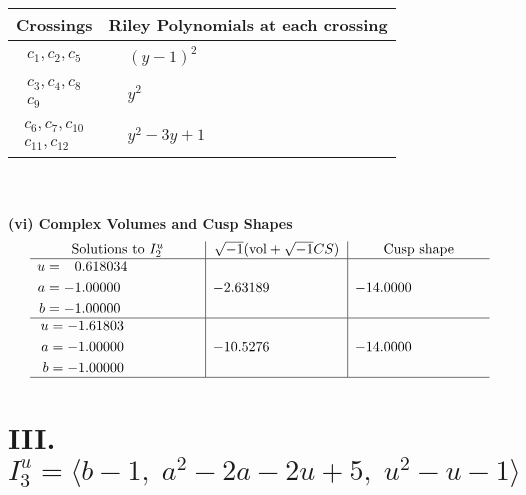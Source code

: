 \documentclass[1p]{elsarticle_modified}
\theoremstyle{definition}
\newcommand{\I}{\sqrt{-1}}
\begin{document}
\begin{tabular}{m{50pt}|m{274pt}}
Crossings & \hspace{64pt}Riley Polynomials at each crossing \\
\hline $$\begin{aligned}c_{1},c_{2},c_{5}\end{aligned}$$&$\begin{aligned}
&(y-1)^2
\end{aligned}$\\
\hline $$\begin{aligned}c_{3},c_{4},c_{8}\\c_{9}\end{aligned}$$&$\begin{aligned}
&y^2
\end{aligned}$\\
\hline $$\begin{aligned}c_{6},c_{7},c_{10}\\c_{11},c_{12}\end{aligned}$$&$\begin{aligned}
&y^2-3 y+1
\end{aligned}$\\
\hline
\end{tabular}\\~\\
\newpage\flushleft \textbf{(vi) Complex Volumes and Cusp Shapes}
$$\begin{array}{c|c|c}  
\text{Solutions to }I^u_{2}& \I (\text{vol} + \sqrt{-1}CS) & \text{Cusp shape}\\
 \hline 
\begin{aligned}
u &= \phantom{-}0.618034\phantom{ +0.000000I} \\
a &= -1.00000\phantom{ +0.000000I} \\
b &= -1.00000\phantom{ +0.000000I}\end{aligned}
 & -2.63189\phantom{ +0.000000I} & -14.0000\phantom{ +0.000000I} \\ \hline\begin{aligned}
u &= -1.61803\phantom{ +0.000000I} \\
a &= -1.00000\phantom{ +0.000000I} \\
b &= -1.00000\phantom{ +0.000000I}\end{aligned}
 & -10.5276\phantom{ +0.000000I} & -14.0000\phantom{ +0.000000I}\\
 \hline 
 \end{array}$$\newpage\newpage\renewcommand{\arraystretch}{1}
\centering \section*{III. $I^u_{3}= \langle b-1,\;a^2-2 a-2 u+5,\;u^2- u-1 \rangle$}
\end{document}
